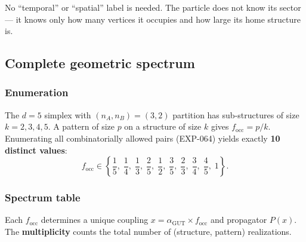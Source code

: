 \documentclass[12pt]{article}
\theoremstyle{remark}
\theoremstyle{definition}
\newcommand{\agut}{\alpha_{\mathrm{GUT}}}
\begin{document}
No ``temporal'' or ``spatial'' label is needed.  The particle does not know its sector --- it knows only how many vertices it occupies and how large its home structure is.

\subsection{Complete geometric spectrum}
\label{sec:spectrum}

\subsubsection{Enumeration}

The $d = 5$ simplex with $(n_A, n_B) = (3,2)$ partition has sub-structures of size $k = 2, 3, 4, 5$.  A pattern of size $p$ on a structure of size $k$ gives $f_\mathrm{occ} = p/k$.  Enumerating all combinatorially allowed pairs (EXP-064) yields exactly \textbf{10 distinct values}:
\begin{equation}
f_\mathrm{occ} \in \left\{\frac{1}{5},\;\frac{1}{4},\;\frac{1}{3},\;\frac{2}{5},\;\frac{1}{2},\;\frac{3}{5},\;\frac{2}{3},\;\frac{3}{4},\;\frac{4}{5},\;1\right\}.
\end{equation}

\subsubsection{Spectrum table}

Each $f_\mathrm{occ}$ determines a unique coupling $x = \agut \times f_\mathrm{occ}$ and propagator $P(x)$.  The \textbf{multiplicity} counts the total number of (structure, pattern) realizations.
\end{document}
